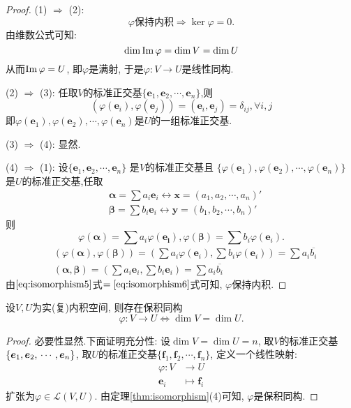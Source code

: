 \begin{proof}
    (1) $\Longrightarrow$ (2):
    \[
      \varphi\text{保持内积} \Longrightarrow \ker\varphi=0.
    \]
    由维数公式可知:
    \[
      \dim\operatorname{Im}\varphi = \dim V = \dim U
    \]
    从而$\operatorname{Im}\varphi = U$, 即$\varphi$是满射,
    于是$\varphi: V \longrightarrow U$是线性同构.

    (2) $\Longrightarrow$ (3):
    任取$V$的标准正交基$\{\bm{e}_1, \bm{e}_2, \cdots, \bm{e}_n\}$,则
    \[
       (\varphi(\bm{e}_i),\varphi(\bm{e}_j)) = (\bm{e}_i,\bm{e}_j) = \delta_{ij}, \forall i,j
     \]
      即$\varphi(\bm{e}_1), \varphi(\bm{e}_2), \cdots, \varphi(\bm{e}_n)$是$U$的一组标准正交基.
  
      (3) $\Longrightarrow$ (4): 显然.
  
      (4) $\Longrightarrow$ (1): 设$\{\bm{e}_1, \bm{e}_2, \cdots, \bm{e}_n\}$
      是$V$的标准正交基且
      $\{\varphi(\bm{e}_1), \varphi(\bm{e}_2), \cdots, \varphi(\bm{e}_n)\}$
      是$U$的标准正交基,任取
      \begin{align*}
         & \bm{\alpha}=\sum a_i\bm{e}_i \longleftrightarrow
          \bm{x}= (a_1,a_2,\cdots,a_n)'\\
        & \bm{\beta}=\sum b_i\bm{e}_i \longleftrightarrow
          \bm{y}= (b_1,b_2,\cdots,b_n)'
      \end{align*}
      则
      \[
        \varphi(\bm{\alpha}) = \sum a_i\varphi(\bm{{e}_i}),
        \varphi(\bm{\beta}) = \sum b_i\varphi(\bm{e}_i).
      \]
      \begin{align}
        & (\varphi(\bm{\alpha}),\varphi(\bm{\beta})) =
          (\sum a_i\varphi(\bm{e}_i),\sum b_i\varphi(\bm{e}_i)) =
          \sum a_i\overline{b_i}\label{eq:isomorphism5}\\
        & (\bm{\alpha},\bm{\beta}) =
          (\sum a_i\bm{e}_i,\sum b_i\bm{e}_i) =
          \sum a_i\overline{b_i}\label{eq:isomorphism6}
      \end{align}
      由$\eqref{eq:isomorphism5}$式$=\eqref{eq:isomorphism6}$式可知,
      $\varphi$保持内积.
\end{proof}

\begin{deduction}
  设$V, U$为实(复)内积空间, 则存在保积同构
  \[
    \varphi: V \longrightarrow U \Longleftrightarrow \dim V = \dim U. 
    \]
\end{deduction}

\begin{proof}
  必要性显然.下面证明充分性:
  设$\dim V = \dim U = n$,
  取$V$的标准正交基$\{\bm{e}_1, \bm{e}_2, \\
  \cdots,\bm{e}_n\}$,
  取$U$的标准正交基$\{\bm{f}_1, \bm{f}_2, \cdots, \bm{f}_n\}$,
  定义一个线性映射:
  \begin{align*}
    \varphi: V & \longrightarrow U\\
    \bm{e}_i & \longmapsto \bm{f}_i
  \end{align*}
  扩张为$\varphi\in \mathscr{L}(V, U)$.
  由定理\ref{thm:isomorphism}(4)可知,
  $\varphi$是保积同构.
\end{proof}

